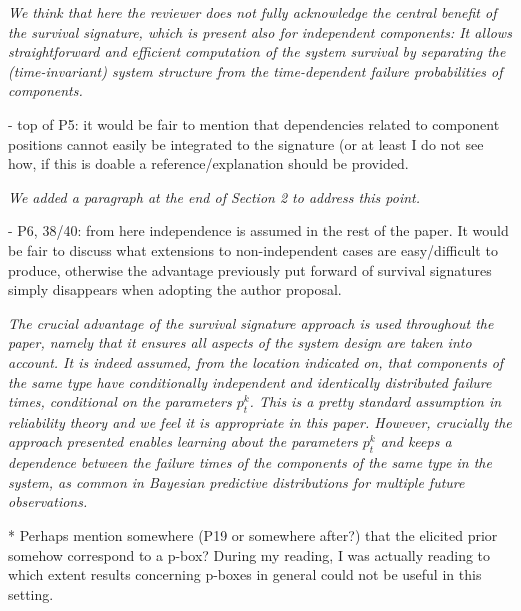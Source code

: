 \documentclass[12pt, a4paper]{elsarticle}
\begin{document}
\medskip
\emph{We think that here the reviewer does not fully acknowledge the central benefit of the survival signature,
which is present also for independent components:
It allows straightforward and efficient computation of the system survival by separating the (time-invariant) system structure from the time-dependent failure probabilities of components.}
\medskip

- top of P5: it would be fair to mention that dependencies related to component positions cannot easily be integrated to the signature (or at least I do not see how, if this is doable a reference/explanation should be provided.

\medskip
\emph{We added a paragraph at the end of Section 2 to address this point.}
\medskip

- P6, 38/40: from here independence is assumed in the rest of the paper. It would be fair to discuss what extensions to non-independent cases are easy/difficult to produce, otherwise the advantage previously put forward of survival signatures simply disappears when adopting the author proposal.
 
\medskip
\emph{The crucial advantage of the survival signature approach is used throughout the paper, namely that it ensures all aspects of the system design are taken into account. It is indeed assumed, from the location indicated on, that components of the same type have conditionally independent and identically distributed failure times, conditional on the parameters $p_t^k$. This is a pretty standard assumption in reliability theory and we feel it is appropriate in this paper. However, crucially the approach presented enables learning about the parameters $p_t^k$ and keeps a dependence between the failure times of the components of the same type in the system, as common in Bayesian predictive distributions for multiple future observations.}
\medskip

* Perhaps mention somewhere (P19 or somewhere after?) that the elicited prior somehow correspond to a p-box? During my reading, I was actually reading to which extent results concerning p-boxes in general could not be useful in this setting.
\end{document}
